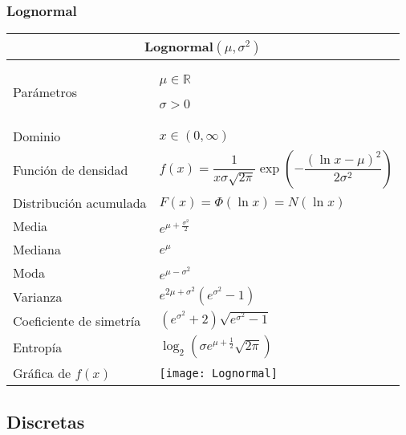 \documentclass[12pt,a4paper]{article}
\newcommand{\salto}[1][2]{\par\vspace{#1mm}}
\begin{document}
\subsubsection*{Lognormal}
\begin{center}
	\begin{tabular}{p{}|p{}}
	\multicolumn{2}{c}{Lognormal$(\mu,\sigma^2)$} \\
	\hline
	Parámetros & $\mu\in\mathbb{R}$\par $\sigma > 0$ \\
	Dominio & $x\in(0,\infty)$ \\
	Función de densidad & $f(x) = \dfrac{1}{x\sigma\sqrt{2\pi}}\exp\left( -\dfrac{(\ln x - \mu)^2}{2\sigma^2} \right)$ \\
	Distribución acumulada & $F(x) = \Phi(\ln x) = N(\ln x)$ \\
	Media & $e^{\mu + \frac{\sigma^2}{2}}$ \\
	Mediana & $e^\mu$ \\
	Moda & $e^{\mu - \sigma^2}$ \\
	Varianza & $e^{2\mu + \sigma^2}(e^{\sigma^2} - 1)$ \\
	Coeficiente de simetría & $(e^{\sigma^2} + 2)\sqrt{e^{\sigma^2} - 1}$ \\
	Entropía & $\log_2(\sigma e^{\mu + \frac{1}{2}}\sqrt{2\pi})$ \\
	\vspace{0.45cm}Gráfica de $f(x)$ & \vspace{0.1mm}\texttt{[image: Lognormal]}
	\end{tabular}
\end{center}
\newpage

\subsection{Discretas}
\salto[5]
\end{document}
